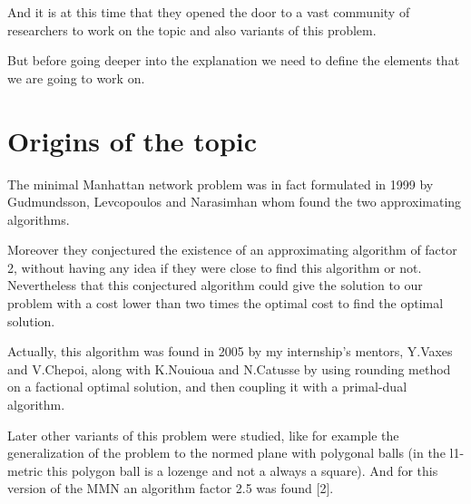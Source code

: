 And it is at this time that they opened the door to a vast community of researchers to work on the topic and also variants of this problem.

But before going deeper into the explanation we need to define the elements that we are going to work on. 

\section{Origins of the topic}%
The minimal Manhattan network problem was in fact formulated in 1999 by Gudmundsson, Levcopoulos and Narasimhan whom found the two approximating algorithms. 

Moreover they conjectured the existence of an approximating algorithm of factor 2, without having any idea if they were close to find this algorithm or not. Nevertheless that this conjectured algorithm could give the solution to our problem with a cost lower than two times the optimal cost to find the optimal solution.

Actually, this algorithm was found in 2005 by my internship's mentors, Y.Vaxes and V.Chepoi, along with K.Nouioua and N.Catusse by using rounding method on a factional optimal solution, and then coupling it with a primal-dual algorithm.

Later other variants of this problem were studied, like for example the generalization of the problem to the normed plane with polygonal balls (in the l1-metric this polygon ball is a lozenge and not a always a square). And for this version of the MMN an algorithm factor 2.5 was found [2].